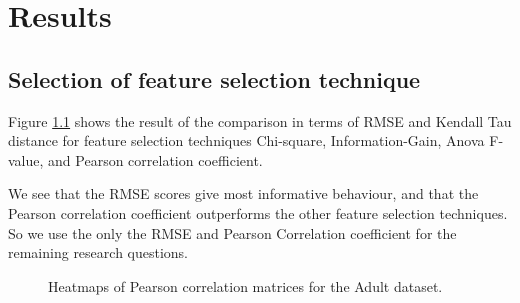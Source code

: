 \chapter{Results}
\label{ch:results}

\section{Selection of feature selection technique}
Figure \ref{fig:selectionofselectiontech} shows the result of the comparison in terms of RMSE and Kendall Tau distance for feature selection techniques Chi-square, Information-Gain, Anova F-value, and Pearson correlation coefficient.

We see that the RMSE scores give most informative behaviour, and that the Pearson correlation coefficient outperforms the other feature selection techniques. So we use the only the RMSE and Pearson Correlation coefficient for the remaining research questions.

\begin{figure}[H]
    \centering
    \qquad
    \caption{Heatmaps of Pearson correlation matrices for the Adult dataset.}
    \label{fig:selectionofselectiontech}
\end{figure}

